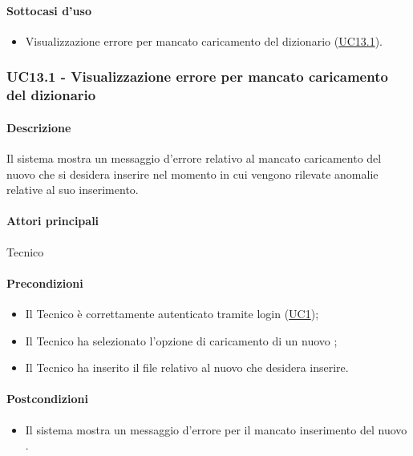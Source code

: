 \paragraph*{Sottocasi d'uso}
\begin{itemize}
  \item Visualizzazione errore per mancato caricamento del dizionario (\hyperref[UC13point1]{UC13.1}).
\end{itemize}


\subsubsection{UC13.1 - Visualizzazione errore per mancato caricamento del dizionario}\label{UC13point1}
\paragraph*{Descrizione}
Il sistema mostra un messaggio d’errore relativo al mancato caricamento del nuovo  che si desidera inserire nel momento in cui vengono rilevate anomalie relative al suo inserimento.

\paragraph*{Attori principali}
Tecnico

\paragraph*{Precondizioni}
\begin{itemize}
  \item Il Tecnico è correttamente autenticato tramite login (\hyperref[UC1]{UC1});
  \item Il Tecnico ha selezionato l’opzione di caricamento di un nuovo ;
  \item Il Tecnico ha inserito il file relativo al nuovo  che desidera inserire.  
\end{itemize}

\paragraph*{Postcondizioni}
\begin{itemize}
  \item Il sistema mostra un messaggio d’errore per il mancato inserimento del nuovo .
\end{itemize}

